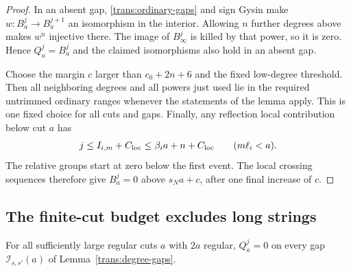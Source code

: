 \begin{proof}
In an absent gap, \eqref{trans:ordinary-gaps} and sign Gysin make
$w:B_a^j\to B_a^{j+1}$ an isomorphism in the interior.  Allowing $n$
further degrees above makes $w^n$ injective there.  The image of
$B_\infty^j$ is killed by that power, so it is zero.  Hence $Q_a^j=B_a^j$
and the claimed isomorphisms also hold in an absent gap.

Choose the margin $c$ larger than $c_0+2n+6$ and the fixed low-degree
threshold.  Then all neighboring degrees and all powers just used lie
in the required untrimmed ordinary ranges whenever the statements of
the lemma apply.  This is one fixed choice for all cuts and gaps.
Finally, any reflection local contribution below cut $a$ has
\[
 j\le I_{i,m}+C_{\rm loc}
   \le \beta_i a+n+C_{\rm loc}\qquad(m\ell_i<a).
\]
The relative groups start at zero below the first event.  The local
crossing sequences therefore give $B_a^j=0$ above $s_Na+c$, after
one final increase of $c$.
\end{proof}

\subsection{The finite-cut budget excludes long strings}

\begin{lemma}\label{trans:no-interior}
For all sufficiently large regular cuts $a$ with $2a$ regular,
$Q_a^j=0$ on every gap $\mathcal I_{s,s'}(a)$ of
Lemma~\ref{trans:degree-gaps}.
\end{lemma}


